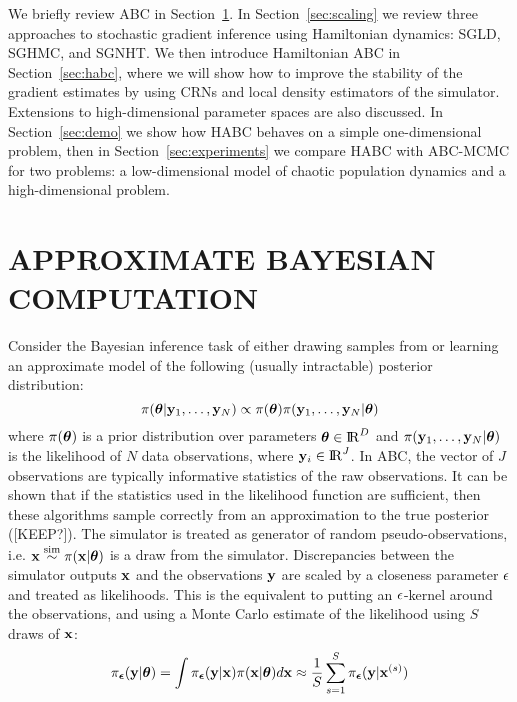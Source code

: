 \documentclass[]{article}
\begin{document}
We briefly review ABC in Section~\ref{sec:abc}.  In Section~\ref{sec:scaling} we review three approaches to stochastic gradient inference using Hamiltonian dynamics: SGLD, SGHMC, and SGNHT.  We then introduce Hamiltonian ABC in Section~\ref{sec:habc}, where  we will show how to improve the stability of the gradient estimates by using CRNs and local density estimators of the simulator.  Extensions to high-dimensional parameter spaces are also discussed.  In Section~\ref{sec:demo} we show how HABC behaves on a simple one-dimensional problem, then in Section~\ref{sec:experiments} we compare HABC with ABC-MCMC for two problems: a low-dimensional model of chaotic population dynamics and a high-dimensional problem. 
 


\section{APPROXIMATE BAYESIAN COMPUTATION}\label{sec:abc}
Consider the Bayesian inference task of either drawing samples from or learning an approximate model of the following (usually intractable) posterior distribution:
\begin{equation}
  \pi({\bm \theta} | {\bf y}_1, \ldots, {\bf y}_N ) \propto \pi({\bm \theta}) \pi( {\bf y}_1, \ldots, {\bf y}_N  | {\bm \theta} )
\end{equation}
where $\pi({\bm \theta})$ is a prior distribution over parameters ${\bm \theta} \in {\rm I\!R}^{D}$ and $\pi( {\bf y}_1, \ldots, {\bf y}_N  | {\bm \theta} )$ is the likelihood of $N$ data observations, where ${\bf y}_i \in {\rm I\!R}^J$.  In ABC, the vector of $J$ observations are typically informative statistics of the raw observations.  It can be shown that if the statistics used in the likelihood function are sufficient, then these algorithms sample correctly from an approximation to the true posterior ([KEEP?]).  
  The simulator is treated as generator of random pseudo-observations, i.e. ${\bf x} \overset{\operatorname{sim}}{\sim} \pi( {\bf x} | {\bm \theta} )$ is a draw from the simulator.  Discrepancies between the simulator outputs ${\bf x}$ and the observations ${\bf y}$ are scaled by a closeness parameter $\epsilon$ and treated as likelihoods.  This is the equivalent to putting an $\epsilon$-kernel around the observations, and using a Monte Carlo estimate of the likelihood using $S$ draws of ${\bf x}$: 
\begin{equation}
  \pi_{{\bm {\epsilon}}}( {\bf y} | {\bm \theta} ) =  \int \pi_{{\bm {\epsilon}}}({\bf y} | {\bf x} ) \pi( {\bf x} | {\bm \theta} ) d{\bf x} 
                           \approx  \frac{1}{S} \sum_{s=1}^S \pi_{{\bm {\epsilon}}}({\bf y} | {\bf x}^{(s)} ) \label{eq:abc_mc_approx}
\end{equation}
\end{document}
